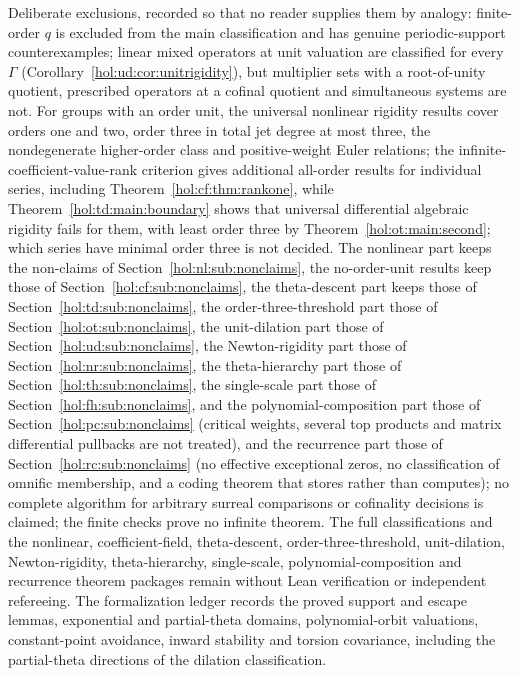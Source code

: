 \documentclass[11pt]{article}
\numberwithin{equation}{section}
\theoremstyle{definition}
\theoremstyle{remark}
\begin{document}
Deliberate exclusions, recorded so that no reader supplies them by analogy:
finite-order $q$ is excluded from the main classification and has genuine
periodic-support counterexamples; linear mixed operators at unit valuation
are classified for every $\Gamma$ (Corollary~\ref{hol:ud:cor:unitrigidity}),
but multiplier sets with a root-of-unity quotient, prescribed operators at a
cofinal quotient and simultaneous systems are not. For groups with an order
unit, the universal nonlinear rigidity results cover orders one and two,
order three in total jet degree at most three, the nondegenerate higher-order
class and positive-weight Euler relations; the infinite-coefficient-value-rank
criterion gives additional all-order results for individual series, including
Theorem~\ref{hol:cf:thm:rankone}, while Theorem~\ref{hol:td:main:boundary}
shows that universal differential algebraic rigidity fails for them, with
least order three by Theorem~\ref{hol:ot:main:second}; which series have
minimal order three is not decided. The nonlinear part keeps the
non-claims of Section~\ref{hol:nl:sub:nonclaims}, the no-order-unit results
keep those of Section~\ref{hol:cf:sub:nonclaims}, the theta-descent part
keeps those of Section~\ref{hol:td:sub:nonclaims}, the
order-three-threshold part those of Section~\ref{hol:ot:sub:nonclaims}, the
unit-dilation part those of Section~\ref{hol:ud:sub:nonclaims}, the
Newton-rigidity part those of Section~\ref{hol:nr:sub:nonclaims}, the
theta-hierarchy part those of Section~\ref{hol:th:sub:nonclaims}, the
single-scale part those of Section~\ref{hol:fh:sub:nonclaims}, and the
polynomial-composition part those of Section~\ref{hol:pc:sub:nonclaims}
(critical weights, several top products and matrix differential pullbacks are
not treated), and the recurrence part those of
Section~\ref{hol:rc:sub:nonclaims} (no effective exceptional zeros, no
classification of omnific membership, and a coding theorem that stores rather
than computes); no
complete algorithm for arbitrary
surreal comparisons or cofinality decisions is claimed; the finite checks
prove no infinite theorem. The full classifications and the nonlinear,
coefficient-field, theta-descent, order-three-threshold, unit-dilation,
Newton-rigidity, theta-hierarchy, single-scale, polynomial-composition and
recurrence theorem packages remain without Lean verification or independent
refereeing.
The formalization ledger records the proved support and escape lemmas,
exponential and partial-theta domains, polynomial-orbit valuations,
constant-point avoidance, inward stability and torsion covariance,
including the partial-theta directions of the dilation classification.
\end{document}
